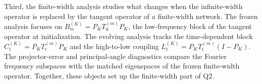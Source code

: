 Third, the finite-width analysis studies what changes when the infinite-width
operator is replaced by the tangent operator of a finite-width network. The
frozen analysis focuses on \(B_m^{(K)}=P_KT_0^{(m)}P_K\), the low-frequency block
of the tangent operator at initialization. The evolving analysis tracks the
time-dependent block \(C_t^{(K)}=P_KT_t^{(m)}P_K\) and the high-to-low coupling
\(L_t^{(K)}=P_KT_t^{(m)}(I-P_K)\). The projector-error and principal-angle
diagnostics compare the Fourier frequency subspaces with the matched
eigenspaces of the frozen finite-width operator. Together, these objects set up
the finite-width part of Q2.
